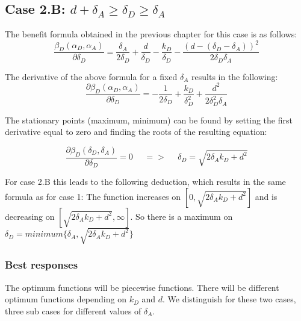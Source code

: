 \subsection*{Case 2.B: $d+\delta_{A} \geq \delta_{D} \geq  \delta_{A} $} 

The benefit formula obtained in the previous chapter for this case is as follows:
\begin{equation*}
\dfrac{\beta_{D}(\alpha_{D},\alpha_{A})}{\partial \delta_{D}} = \dfrac{\delta_{A}}{2\delta_{D}} + \dfrac{d}{\delta_{D}} - \dfrac{k_{D}}{\delta_{D}} - \dfrac{(d-(\delta_{D} - \delta_{A}))^{2}}{2\delta_{D}\delta_{A}}
\end{equation*}

The derivative of the above formula for a fixed $\delta_{A}$ results in the following:
\begin{equation*}
\frac{\partial \beta_{D}(\alpha_{D},\alpha_{A})}{\partial \delta_{D}} =  - \dfrac{1}{2\delta_{D}} + \dfrac{k_{D}}{\delta_{D}^{2}} + \dfrac{d^{2}}{2\delta_{D}^{2}\delta_{A}}
\end{equation*}


The stationary points (maximum, minimum) can be found by setting the first derivative equal to zero and finding the roots of the resulting equation:

\begin{equation*}
\frac{\partial \beta_{D}(\delta_{D},\delta_{A})}{\partial \delta_{D}} =0 ~~~~~~ =>~~~~~~ \delta_{D} = \sqrt{2\delta_{A}k_{D} + d^{2}}
\end{equation*}


For case 2.B this leads to the following deduction, which results in the same formula as for case 1: The function increases on $[0, \sqrt{2\delta_{A}k_{D} + d^{2}}]$ and is decreasing on $[\sqrt{2\delta_{A}k_{D} + d^{2}}, \infty]$. So there is a maximum on $\delta_{D} = minimum \{ \delta_{A}, \sqrt{2\delta_{A}k_{D} + d^{2}} \} $ \\

\subsubsection{Best responses}
The optimum functions will be piecewise functions. There will be different optimum functions depending on $k_{D}$ and $d$. We distinguish for these two cases, three sub cases for different values of $\delta_{A}$. 

